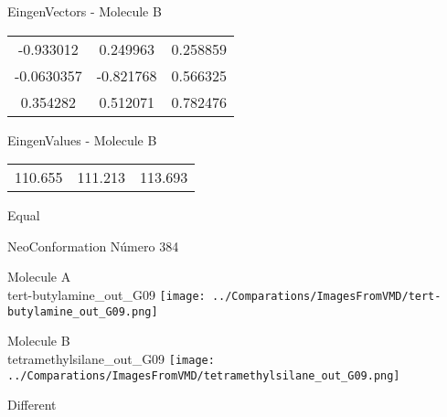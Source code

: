 \begin{multicols}{2}
\begin{center}
\vtab
 EingenVectors - Molecule B     \\
\vtab
\begin{tabular}{|c c c|}
-0.933012	 & 	0.249963	 & 	0.258859	 \\
-0.0630357	 & 	-0.821768	 & 	0.566325	 \\
0.354282	 & 	0.512071	 & 	0.782476
\end{tabular}

\vtab
 EingenValues - Molecule B     \\
\vtab
\begin{tabular}{|c c c|}
110.655	 & 	111.213	 & 	113.693	 \\
\end{tabular}

\end{center}
\end{multicols}
\begin{center}
\vtab
\vtab
\textcolor{NavyBlue}{\Large Equal}
\end{center}

 \newpage

\vtab[-2cm]
\begin{center}
{\large NeoConformation \tab Número 384}
\end{center}
\begin{multicols}{2}
\begin{center}
Molecule A \\ 
tert-butylamine\_out\_G09
\texttt{[image: ../Comparations/ImagesFromVMD/tert-butylamine\_out\_G09.png]}
\\
\vtab

\columnbreak
Molecule B \\ 
tetramethylsilane\_out\_G09
\texttt{[image: ../Comparations/ImagesFromVMD/tetramethylsilane\_out\_G09.png]}
\\
\vtab


\end{center}
\end{multicols}
\begin{center}
\vtab
\vtab
\textcolor{NavyBlue}{\Large Different}
\end{center}

 \newpage

